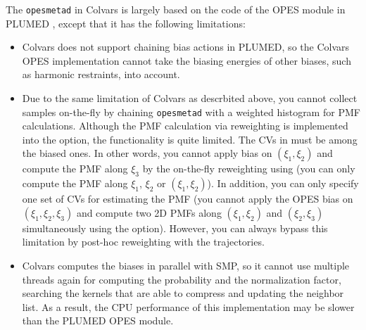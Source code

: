 The \texttt{opes{\textunderscore}metad} in Colvars is largely based on the code of the OPES module in PLUMED \cite{tribello_plumed_2014}, except that it has the following limitations:
\begin{itemize}
\item Colvars does not support chaining bias actions in PLUMED, so the Colvars OPES implementation cannot take the biasing energies of other biases, such as harmonic restraints, into account.
\item Due to the same limitation of Colvars as descrbited above, you cannot collect samples on-the-fly by chaining \texttt{opes{\textunderscore}metad} with a weighted histogram for PMF calculations. Although the PMF calculation via reweighting is implemented into the  option, the functionality is quite limited. The CVs in  must be among the biased ones. In other words, you cannot apply bias on $(\xi_1, \xi_2)$ and compute the PMF along $\xi_3$ by the on-the-fly reweighting using  (you can only compute the PMF along $\xi_1$, $\xi_2$ or $(\xi_1, \xi_2)$). In addition, you can only specify one set of CVs for estimating the PMF (you cannot apply the OPES bias on $(\xi_1, \xi_2, \xi_3)$ and compute two 2D PMFs along $(\xi_1, \xi_2)$ and $(\xi_2, \xi_3)$ simultaneously using the  option). However, you can always bypass this limitation by post-hoc reweighting with the trajectories.
\item Colvars computes the biases in parallel with SMP, so it cannot use multiple threads again for computing the probability and the normalization factor, searching the kernels that are able to compress and updating the neighbor list. As a result, the CPU performance of this implementation may be slower than the PLUMED OPES module.
\end{itemize}

